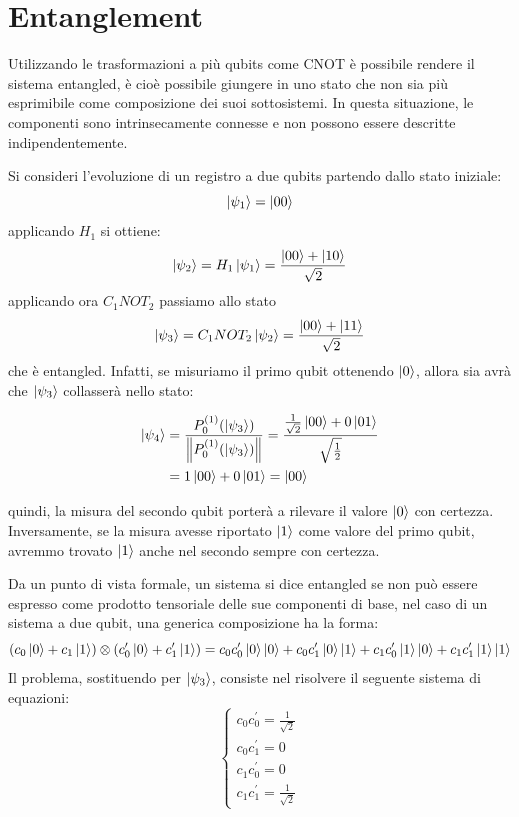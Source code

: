 \documentclass[12pt,a4paper,openright]{report}
\newcommand{\norm}[1]{\left\lVert#1\right\rVert}
\begin{document}
\section{Entanglement}
Utilizzando le trasformazioni a più qubits come CNOT è possibile rendere il sistema entangled, è cioè possibile giungere in uno stato che non sia più esprimibile come composizione dei suoi sottosistemi.
In questa situazione, le componenti sono intrinsecamente connesse e non possono essere descritte indipendentemente.\par
Si consideri l'evoluzione di un registro a due qubits partendo dallo stato iniziale:    
\[
    \ket{\psi_1}= \ket{00}
\] 
applicando $H_1$ si ottiene:
\[
    \ket{\psi_2} = H_1\ket{\psi_1} = \frac{ \ket{00} + \ket{10} }{\sqrt2}
\]
applicando ora $C_1NOT_2$ passiamo allo stato 
\[
    \ket{\psi_3} = C_1NOT_2\ket{\psi_2} = \frac{ \ket{00} + \ket{11} }{\sqrt2}
\]
che è entangled. Infatti, se misuriamo il primo qubit ottenendo $\ket0$, allora sia avrà che $\ket{\psi_3}$ collasserà nello stato:
\begin{center}
    \begin{align*}
        \ket{\psi_4} &= \frac{{P^{(1)}_0}(\ket{\psi_3}) }{ \norm{{P^{(1)}_0}(\ket{\psi_3})} } = \frac{  \frac{1}{\sqrt2}\ket{00} + 0\ket{01}  }{\sqrt{\frac{1}{2}}}\\*
        &=1\ket{00} + 0\ket{01} = \ket{00}
    \end{align*}
\end{center}
quindi, la misura del secondo qubit porterà a rilevare il valore $\ket0$ con certezza. Inversamente, se la misura avesse riportato $\ket1$ come valore del primo qubit, avremmo trovato $\ket1$ anche nel secondo
sempre con certezza.\par Da un punto di vista formale, un sistema si dice entangled se non può essere espresso come prodotto tensoriale delle sue componenti di base, nel caso di un sistema a due qubit, una generica composizione
ha la forma:
    \[
        (c_0\ket{0} + c_1\ket{1}) \otimes (c^{\prime}_0\ket{0} + c^{\prime}_1\ket{1}) = c_0c^{\prime}_0\ket{0}\ket{0} + c_0c^{\prime}_1\ket{0}\ket{1} + c_1c^{\prime}_0\ket{1}\ket{0} + c_1c^{\prime}_1\ket{1}\ket{1}
    \]
Il problema, sostituendo per $\ket{\psi_3}$, consiste nel risolvere il seguente sistema di equazioni:
\[\begin{cases} 
    c_0c^{\prime}_0 = \frac{1}{\sqrt2} \\ 
    c_0c^{\prime}_1 = 0\\ 
    c_1c^{\prime}_0 = 0\\
    c_1c^{\prime}_1 = \frac{1}{\sqrt2}
\end{cases}
\]  
\end{document}
